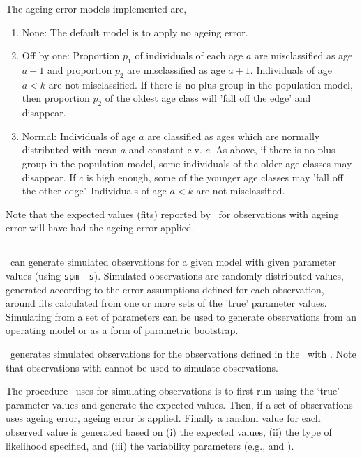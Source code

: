 The ageing error models implemented are,
\begin{enumerate}
  \item{None}: The default model is to apply no ageing error.
  \item{Off by one}: Proportion $p_1$ of individuals of each age $a$ are misclassified as age $a-1$ and proportion $p_2$ are misclassified as age $a+1$. Individuals of age $a < k$ are not misclassified. If there is no plus group in the population model, then proportion $p_2$ of the oldest age class will 'fall off the edge' and disappear. 
  \item{Normal}: Individuals of age $a$ are classified as ages which are normally distributed with mean $a$ and constant c.v. $c$. As above, if there is no plus group in the population model, some individuals of the older age classes may disappear. If $c$ is high enough, some of the younger age classes may 'fall off the other edge'. Individuals of age $a < k$ are not misclassified.
\end{enumerate}

Note that the expected values (fits) reported by \SPM\ for observations with ageing error will have had the ageing error applied. 

\subsection{\label{sec:simulation-observations}}

\SPM\ can generate simulated observations for a given model with given parameter values (using \texttt{spm -s}). Simulated observations are randomly distributed values, generated according to the error assumptions defined for each observation, around fits calculated from one or more sets of the 'true' parameter values. Simulating from a set of parameters can be used to generate observations from an operating model or as a form of parametric bootstrap. 

\SPM\ generates simulated observations for the observations defined in the \config\ with . Note that observations with  cannot be used to simulate observations.

The procedure \SPM\ uses for simulating observations is to first run using the `true' parameter values and generate the expected values. Then, if a set of observations uses ageing error, ageing error is applied. Finally a random value for each observed value is generated based on (i) the expected values, (ii) the type of likelihood specified, and (iii) the variability parameters (e.g.,  and ). 

